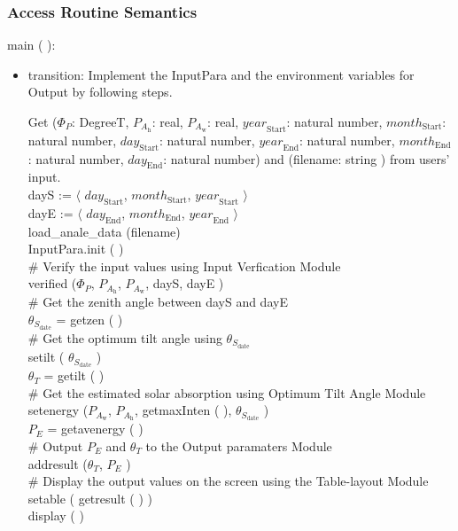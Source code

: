\documentclass[12pt, titlepage]{article}
\begin{document}
\subsubsection{ Access Routine Semantics}

\noindent  main ( ):

\begin{itemize}
\item transition: Implement the InputPara and  the environment variables for Output by following steps.

Get ($\Phi_P$: DegreeT, $P_{A_{\text{h}}}$: real, $P_{A_{\text{w}}}$: real, $\mathit{year}_\text{Start}$: natural number, $\mathit{month}_\text{Start}$: natural number, $\mathit{day}_\text{Start}$: natural number, $\mathit{year}_\text{End}$: natural number, $\mathit{month}_\text{End}$: natural number, $\mathit{day}_\text{End}$: natural number) and (filename: string ) from users' input.\\

dayS := $\langle$ $\mathit{day}_\text{Start}$, $\mathit{month}_\text{Start}$, $\mathit{year}_\text{Start}$ $\rangle$ \\
dayE :=  $\langle$ $\mathit{day}_\text{End}$, $\mathit{month}_\text{End}$, $\mathit{year}_\text{End}$ $\rangle$ \\

load\_anale\_data (filename)\\
InputPara.init ( )\\

$\#$ Verify the input values using Input Verfication Module\\
verified ($\Phi_P$, $P_{A_{\text{h}}}$, $P_{A_{\text{w}}}$, dayS, dayE )\\

$\#$ Get the zenith angle between dayS and
dayE\\
$\theta_{S_{\text{date}}}$ = getzen ( )\\

$\#$ Get the optimum tilt angle using $\theta_{S_{\text{date}}}$\\
setilt ( $\theta_{S_{\text{date}}}$ )\\
$\theta_{T}$ = getilt ( )\\


$\#$ Get the estimated solar absorption using Optimum Tilt Angle Module\\
setenergy ($P_{A_{\text{w}}}$, $P_{A_{\text{h}}}$, getmaxInten ( ), $\theta_{S_{\text{date}}}$ )\\
$P_{E}$ = getavenergy ( )\\

$\#$ Output $P_{E}$ and $\theta_{T}$ to the Output paramaters Module\\
addresult ($\theta_{T}$, $P_{E}$ )\\

$\#$ Display the output values on the screen using the Table-layout Module\\
setable ( getresult ( ) )\\
display ( )

\end{itemize}
\end{document}

